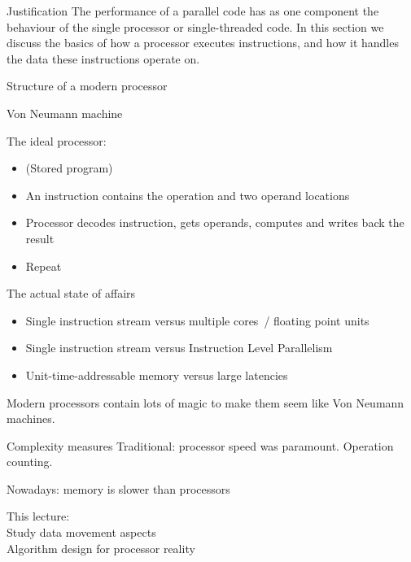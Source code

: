 
\begin{numberedframe}{Justification}
The performance of a parallel code has as one component
the behaviour of the single processor or single-threaded code. 
In this section we discuss the basics of how a processor
executes instructions, and how it handles the data
these instructions operate on.
\end{numberedframe}

 {Structure of a modern processor}

\begin{numberedframe}{Von Neumann machine}

The ideal processor:
\begin{itemize}
\item (Stored program)
\item An instruction contains the operation and two operand locations
\item Processor decodes instruction, gets operands, computes and writes back the result
\item Repeat
\end{itemize}

\end{numberedframe}

\begin{numberedframe}{The actual state of affairs}

  \begin{itemize}
  \item Single instruction stream versus multiple cores~/ floating point units
  \item Single instruction stream versus Instruction Level Parallelism
  \item Unit-time-addressable memory versus large latencies
  \end{itemize}
  Modern processors contain lots of magic to make them seem like Von Neumann machines.
\end{numberedframe}

\begin{numberedframe}{Complexity measures}
  Traditional: processor speed was paramount. Operation counting.

  Nowadays: memory is slower than processors 

  This lecture:\\
      Study data movement aspects\\
      Algorithm design for processor reality
\end{numberedframe}

